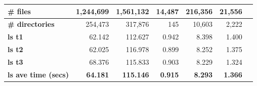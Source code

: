 \documentclass[12pt]{article}
\begin{document}
\begin{center}
\begin{tabular}{|l|r|r|r|r|r|l|}
    \textbf{\# files}                & 1,244,699                         & 1,561,132                         & 14,487                                                                                   & 216,356                                                                                     & 21,556                                                                                        &                                    \\ \hline
    \textbf{\# directories}          & 254,473                           & 317,876                           & 145                                                                                      & 10,603                                                                                      & 2,222                                                                                         &                                    \\ \hline
    \textbf{ls t1}                   & 62.142                            & 112.627                           & 0.942                                                                                    & 8.398                                                                                       & 1.400                                                                                         &                                    \\ \hline
    \textbf{ls t2}                   & 62.025                            & 116.978                           & 0.899                                                                                    & 8.252                                                                                       & 1.375                                                                                         &                                    \\ \hline
    \textbf{ls t3}                   & 68.376                            & 115.833                           & 0.903                                                                                    & 8.229                                                                                       & 1.324                                                                                         &                                    \\ \hline
    \textbf{ls ave time (secs)}      & \textbf{64.181}                   & \textbf{115.146}                  & \textbf{0.915}                                                                           & \textbf{8.293}                                                                              & \textbf{1.366}                                                                                & \textbf{}                          \\ \hline

\end{tabular}
\end{center}
\end{document}
